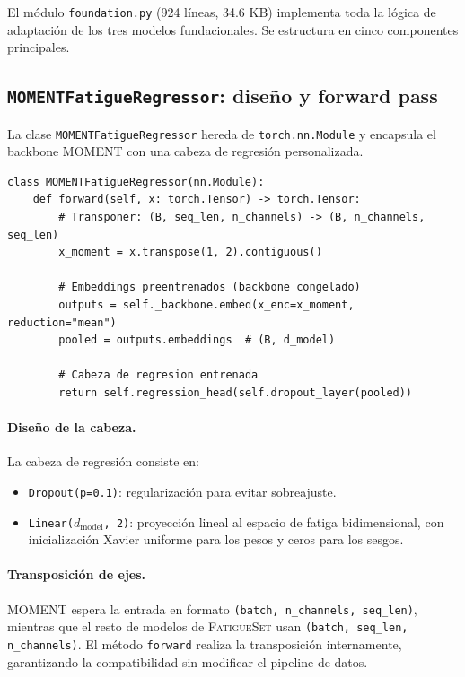\documentclass[12pt, a4paper]{article}
\newcommand{\code}[1]{\texttt{#1}}
\newcommand{\fatigueset}{\textsc{FatigueSet}}
\newcommand{\moment}{\textsc{MOMENT}}
\begin{document}
El módulo \code{foundation.py} (924 líneas, 34.6 KB) implementa toda la lógica de adaptación de los tres modelos fundacionales. Se estructura en cinco componentes principales.

\subsection{\code{MOMENTFatigueRegressor}: diseño y forward pass}

La clase \code{MOMENTFatigueRegressor} hereda de \code{torch.nn.Module} y encapsula el backbone \moment{} con una cabeza de regresión personalizada.

\begin{lstlisting}[caption={Paso forward de MOMENTFatigueRegressor (simplificado).}, label={lst:moment_forward}]
class MOMENTFatigueRegressor(nn.Module):
    def forward(self, x: torch.Tensor) -> torch.Tensor:
        # Transponer: (B, seq_len, n_channels) -> (B, n_channels, seq_len)
        x_moment = x.transpose(1, 2).contiguous()

        # Embeddings preentrenados (backbone congelado)
        outputs = self._backbone.embed(x_enc=x_moment, reduction="mean")
        pooled = outputs.embeddings  # (B, d_model)

        # Cabeza de regresion entrenada
        return self.regression_head(self.dropout_layer(pooled))
\end{lstlisting}

\paragraph{Diseño de la cabeza.} La cabeza de regresión consiste en:
\begin{itemize}
    \item \code{Dropout(p=0.1)}: regularización para evitar sobreajuste.
    \item \code{Linear($d_{\text{model}}$, 2)}: proyección lineal al espacio de fatiga bidimensional, con inicialización Xavier uniforme para los pesos y ceros para los sesgos.
\end{itemize}

\paragraph{Transposición de ejes.} \moment{} espera la entrada en formato \code{(batch, n\_channels, seq\_len)}, mientras que el resto de modelos de \fatigueset{} usan \code{(batch, seq\_len, n\_channels)}. El método \code{forward} realiza la transposición internamente, garantizando la compatibilidad sin modificar el pipeline de datos.
\end{document}
